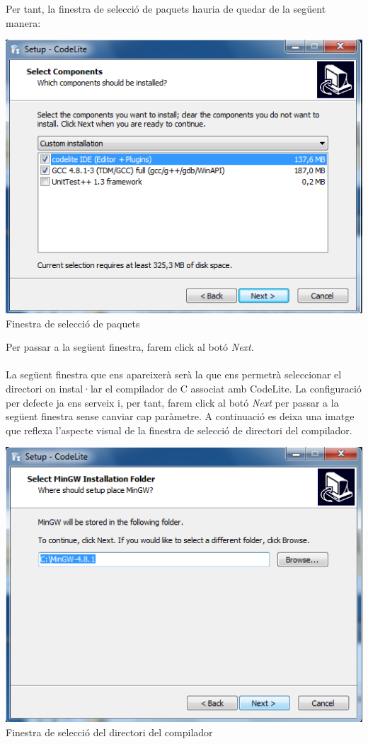 \documentclass[11pt]{article}
\begin{document}
\noindent Per tant, la finestra de selecció de paquets hauria de quedar de la següent manera:

\begin{center}
\includegraphics[scale=0.4]{img/Installer_5.png}\\
\small{Finestra de selecció de paquets}
\end{center}

\noindent Per passar a la següent finestra, farem click al botó \textit{Next}.\\\\
La següent finestra que ens apareixerà serà la que ens permetrà seleccionar el directori on instal·lar el compilador de C associat amb CodeLite. La configuració per defecte ja ens serveix i, per tant, farem click al botó \textit{Next} per passar a la següent finestra sense canviar cap paràmetre. A continuació es deixa una imatge que reflexa l'aspecte visual de la finestra de selecció de directori del compilador.

\begin{center}
\includegraphics[scale=0.4]{img/Installer_6.png}\\
\small{Finestra de selecció del directori del compilador}
\end{center}
\end{document}
